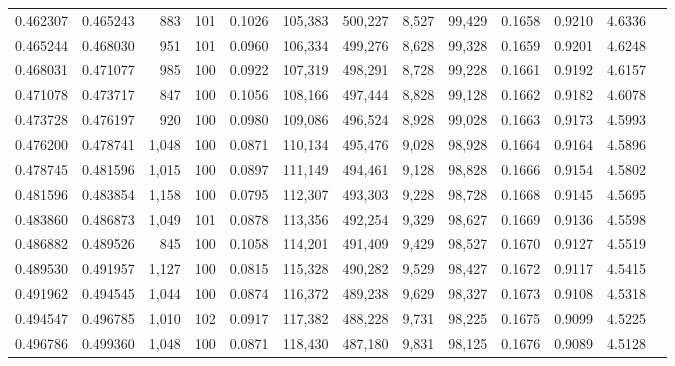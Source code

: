 \begin{tabular}{rrrrrrrrrrrrr}
0.462307 & 0.465243 &   883 & 101 &                                     0.1026 & 105,383 & 500,227 &   8,527 &  99,429 & 0.1658 & 0.9210 & 4.6336 \\
0.465244 & 0.468030 &   951 & 101 &                                     0.0960 & 106,334 & 499,276 &   8,628 &  99,328 & 0.1659 & 0.9201 & 4.6248 \\
0.468031 & 0.471077 &   985 & 100 &                                     0.0922 & 107,319 & 498,291 &   8,728 &  99,228 & 0.1661 & 0.9192 & 4.6157 \\
0.471078 & 0.473717 &   847 & 100 &                                     0.1056 & 108,166 & 497,444 &   8,828 &  99,128 & 0.1662 & 0.9182 & 4.6078 \\
0.473728 & 0.476197 &   920 & 100 &                                     0.0980 & 109,086 & 496,524 &   8,928 &  99,028 & 0.1663 & 0.9173 & 4.5993 \\
0.476200 & 0.478741 & 1,048 & 100 &                                     0.0871 & 110,134 & 495,476 &   9,028 &  98,928 & 0.1664 & 0.9164 & 4.5896 \\
0.478745 & 0.481596 & 1,015 & 100 &                                     0.0897 & 111,149 & 494,461 &   9,128 &  98,828 & 0.1666 & 0.9154 & 4.5802 \\
0.481596 & 0.483854 & 1,158 & 100 &                                     0.0795 & 112,307 & 493,303 &   9,228 &  98,728 & 0.1668 & 0.9145 & 4.5695 \\
0.483860 & 0.486873 & 1,049 & 101 &                                     0.0878 & 113,356 & 492,254 &   9,329 &  98,627 & 0.1669 & 0.9136 & 4.5598 \\
0.486882 & 0.489526 &   845 & 100 &                                     0.1058 & 114,201 & 491,409 &   9,429 &  98,527 & 0.1670 & 0.9127 & 4.5519 \\
0.489530 & 0.491957 & 1,127 & 100 &                                     0.0815 & 115,328 & 490,282 &   9,529 &  98,427 & 0.1672 & 0.9117 & 4.5415 \\
0.491962 & 0.494545 & 1,044 & 100 &                                     0.0874 & 116,372 & 489,238 &   9,629 &  98,327 & 0.1673 & 0.9108 & 4.5318 \\
0.494547 & 0.496785 & 1,010 & 102 &                                     0.0917 & 117,382 & 488,228 &   9,731 &  98,225 & 0.1675 & 0.9099 & 4.5225 \\
0.496786 & 0.499360 & 1,048 & 100 &                                     0.0871 & 118,430 & 487,180 &   9,831 &  98,125 & 0.1676 & 0.9089 & 4.5128 \\

\end{tabular}
